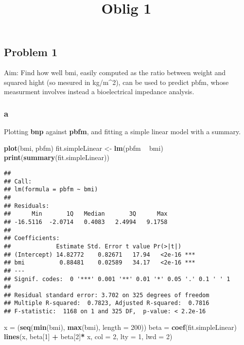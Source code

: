 \documentclass[
]{article}
\title{Oblig 1}
\author{}
\date{\vspace{-2.5em}}
\newenvironment{Shaded}{\begin{snugshade}}{\end{snugshade}}
\newcommand{\DataTypeTok}[1]{\textcolor[rgb]{0.13,0.29,0.53}{#1}}
\newcommand{\DecValTok}[1]{\textcolor[rgb]{0.00,0.00,0.81}{#1}}
\newcommand{\KeywordTok}[1]{\textcolor[rgb]{0.13,0.29,0.53}{\textbf{#1}}}
\newcommand{\NormalTok}[1]{#1}
\newcommand{\OperatorTok}[1]{\textcolor[rgb]{0.81,0.36,0.00}{\textbf{#1}}}
\newcommand{\StringTok}[1]{\textcolor[rgb]{0.31,0.60,0.02}{#1}}
\begin{document}
\maketitle

\hypertarget{problem-1}{%
\subsection{Problem 1}\label{problem-1}}

Aim: Find how well bmi, easily computed as the ratio between weight and
squared hight (so mesured in kg/m\^{}2), can be used to predict pbfm,
whose measurment involves instead a bioelectrical impedance analysis.

\hypertarget{a}{%
\subsubsection{a}\label{a}}

Plotting \textbf{bnp} against \textbf{pbfm}, and fitting a simple linear
model with a summary.

\begin{Shaded}
\begin{Highlighting}[]
\KeywordTok{plot}\NormalTok{(bmi, pbfm)}
\NormalTok{fit.simpleLinear <-}\StringTok{ }\KeywordTok{lm}\NormalTok{(pbfm }\OperatorTok{~}\StringTok{ }\NormalTok{bmi)}
\KeywordTok{print}\NormalTok{(}\KeywordTok{summary}\NormalTok{(fit.simpleLinear))}
\end{Highlighting}
\end{Shaded}

\begin{verbatim}
## 
## Call:
## lm(formula = pbfm ~ bmi)
## 
## Residuals:
##      Min       1Q   Median       3Q      Max 
## -16.5116  -2.0714   0.4083   2.4994   9.1758 
## 
## Coefficients:
##             Estimate Std. Error t value Pr(>|t|)    
## (Intercept) 14.82772    0.82671   17.94   <2e-16 ***
## bmi          0.88481    0.02589   34.17   <2e-16 ***
## ---
## Signif. codes:  0 '***' 0.001 '**' 0.01 '*' 0.05 '.' 0.1 ' ' 1
## 
## Residual standard error: 3.702 on 325 degrees of freedom
## Multiple R-squared:  0.7823, Adjusted R-squared:  0.7816 
## F-statistic:  1168 on 1 and 325 DF,  p-value: < 2.2e-16
\end{verbatim}

\begin{Shaded}
\begin{Highlighting}[]
\NormalTok{x =}\StringTok{ }\NormalTok{(}\KeywordTok{seq}\NormalTok{(}\KeywordTok{min}\NormalTok{(bmi), }\KeywordTok{max}\NormalTok{(bmi), }\DataTypeTok{length =} \DecValTok{200}\NormalTok{))}
\NormalTok{beta =}\StringTok{ }\KeywordTok{coef}\NormalTok{(fit.simpleLinear)}
\KeywordTok{lines}\NormalTok{(x, beta[}\DecValTok{1}\NormalTok{] }\OperatorTok{+}\StringTok{ }\NormalTok{beta[}\DecValTok{2}\NormalTok{]}\OperatorTok{*}\StringTok{ }\NormalTok{x, }\DataTypeTok{col =} \DecValTok{2}\NormalTok{, }\DataTypeTok{lty =} \DecValTok{1}\NormalTok{, }\DataTypeTok{lwd =} \DecValTok{2}\NormalTok{)}
\end{Highlighting}
\end{Shaded}
\end{document}
